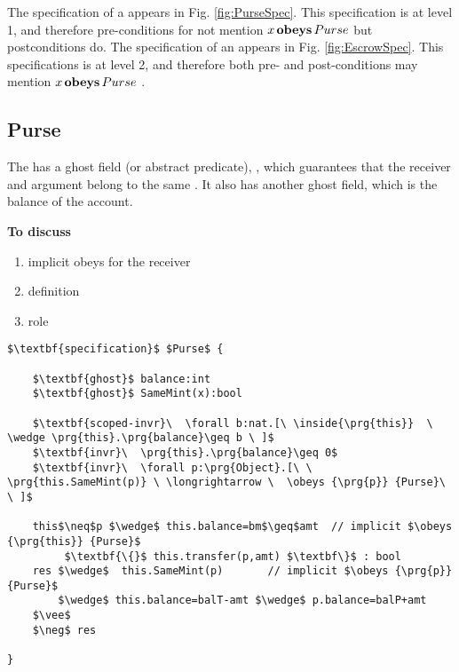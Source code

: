 
The specification of  a  appears in Fig. \ref{fig:PurseSpec}. This specification is at level 1, and therefore pre-conditions for not mention $x\, \textbf{obeys} \, Purse$ but postconditions do.
The specification of  an   appears in Fig. \ref{fig:EscrowSpec}. This specifications is at level 2, and therefore both pre- and post-conditions may mention  $x\, \textbf{obeys} \, Purse$ .

\newcommand{\sMT}{sellerM} 
\newcommand{\bMT}{buyerM}
\newcommand{\sGT}{sellerG} 
\newcommand{\bGT}{buyerG}
\newcommand{\sM}{\prg{\sMT}}
\newcommand{\bM}{\prg{\bMT}}
\newcommand{\sG}{\prg{\sGT}}
\newcommand{\bG}{\prg{\sGT}}


\subsection{Purse}

The  has a ghost field (or abstract predicate), , which guarantees that the receiver and argument belong to the same .  It also has another ghost field, which is the balance of the account.

\textbf{To discuss} \begin{enumerate}
\item
implicit obeys for the receiver
\item
{} definition
\item
{} role
\end{enumerate}

\begin{figure*}[t]
\begin{lstlisting}[mathescape=true, language=Chainmail, frame=lines]
$\textbf{specification}$ $Purse$ {
    
    $\textbf{ghost}$ balance:int
    $\textbf{ghost}$ SameMint(x):bool  
         
    $\textbf{scoped-invr}\  \forall b:nat.[\ \inside{\prg{this}}  \ \wedge \prg{this}.\prg{balance}\geq b \ ]$
    $\textbf{invr}\  \prg{this}.\prg{balance}\geq 0$       
    $\textbf{invr}\  \forall p:\prg{Object}.[\ \ \prg{this.SameMint(p)} \ \longrightarrow \  \obeys {\prg{p}} {Purse}\ \ ]$
     
    this$\neq$p $\wedge$ this.balance=bm$\geq$amt  // implicit $\obeys {\prg{this}} {Purse}$
         $\textbf{\{}$ this.transfer(p,amt) $\textbf\}$ : bool
    res $\wedge$  this.SameMint(p)       // implicit $\obeys {\prg{p}} {Purse}$
        $\wedge$ this.balance=balT-amt $\wedge$ p.balance=balP+amt 
    $\vee$
    $\neg$ res

}

\end{lstlisting}
\caption{Specification of  $Purse$ }
\label{fig:PurseSpec}
 \end{figure*}

